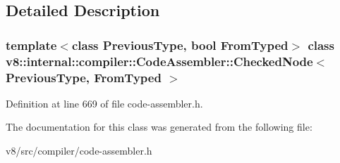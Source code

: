 \subsection{Detailed Description}
\subsubsection*{template$<$class Previous\+Type, bool From\+Typed$>$\newline
class v8\+::internal\+::compiler\+::\+Code\+Assembler\+::\+Checked\+Node$<$ Previous\+Type, From\+Typed $>$}



Definition at line 669 of file code-\/assembler.\+h.



The documentation for this class was generated from the following file\+:\begin{DoxyCompactItemize}
\item 
v8/src/compiler/code-\/assembler.\+h\end{DoxyCompactItemize}
